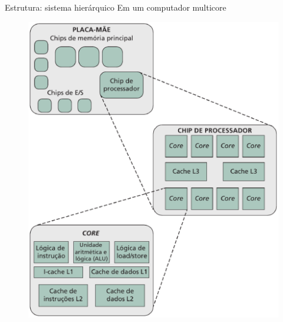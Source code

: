 \begin{slide}[toc=]{Estrutura: sistema hierárquico}
    Em um computador multicore
    \begin{figure}[h]
      \centering
      \includegraphics[height = 0.73\textheight]{figs/estrutura_multicore.eps}
    \end{figure}
\end{slide}
 
